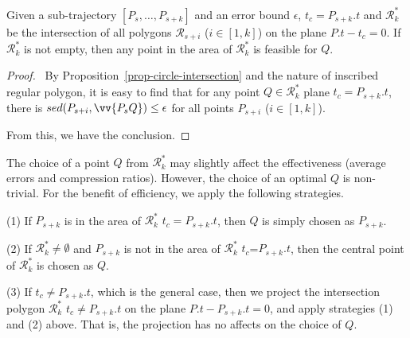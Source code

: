 \begin{prop}
\label{prop-cist-Q}
Given a sub-trajectory ${[P_s, \ldots, P_{s+k}]}$ and an error bound $\epsilon$,  $t_c=P_{s+k}.t$ and $\mathcal{R}^*_k$ be the intersection of all polygons $\mathcal{R}_{s+i}$ ($i\in[1,k]$) on the plane $P.t - t_c = 0$. If $\mathcal{R}^*_k$ is not empty, then any point in the area of $\mathcal{R}^*_k$ is feasible for $Q$.
\end{prop}

\begin{proof}\ 
By Proposition~\ref{prop-circle-intersection} and the nature of inscribed regular polygon, it is easy to find that for any point $Q \in \mathcal{R}^*_k$  \wrt plane $t_c=P_{s+k}.t$, there is $sed(P_{s+i}, \vv{P_sQ})\le \epsilon$ for all points $P_{s+i}$ ($i \in [1,k]$). 

From this, we have the conclusion. \eop
\end{proof}

The choice of a point $Q$ from $\mathcal{R}^*_k$ may slightly affect the effectiveness (\eg average errors and compression ratios). However, the choice of an optimal $Q$ is non-trivial. For the benefit of efficiency, we apply the following strategies.

\sstab (1) If $P_{s+k}$ is in the area of $\mathcal{R}^*_k$ \wrt $t_c=P_{s+k}.t$, then $Q$ is simply chosen as $P_{s+k}$.

\sstab (2) If $\mathcal{R}^*_k \ne \emptyset$ and $P_{s+k}$ is not in the area of $\mathcal{R}^*_k$ \wrt $t_c$=$P_{s+k}.t$, then the central point of $\mathcal{R}^*_k$ is chosen as $Q$.

\sstab (3)  If $t_c \ne P_{s+k}.t$, which is the general case, then we project the intersection polygon $\mathcal{R}^*_k$ \wrt $t_c \ne P_{s+k}.t$ on the plane $P.t -P_{s+k}.t = 0$, and apply strategies (1) and (2) above. That is, the projection has no affects on the choice of $Q$.

